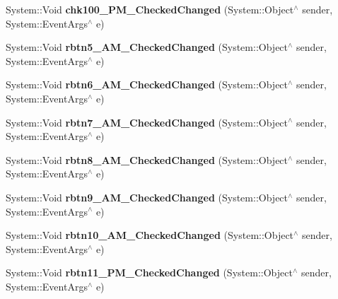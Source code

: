 \begin{DoxyCompactItemize}
\mbox{\label{class_project1_1_1_my_form_ac8af13c679c845dc2d29e9720146a7be}} 
System\+::\+Void {\bfseries chk100\+\_\+P\+M\+\_\+\+Checked\+Changed} (System\+::\+Object$^\wedge$ sender, System\+::\+Event\+Args$^\wedge$ e)
\item 
\mbox{\label{class_project1_1_1_my_form_a7147d1d188fee9fd56869d07780a08f8}} 
System\+::\+Void {\bfseries rbtn5\+\_\+A\+M\+\_\+\+Checked\+Changed} (System\+::\+Object$^\wedge$ sender, System\+::\+Event\+Args$^\wedge$ e)
\item 
\mbox{\label{class_project1_1_1_my_form_ad0f51e6d0ec40ceb0e3123a0d0440ff4}} 
System\+::\+Void {\bfseries rbtn6\+\_\+A\+M\+\_\+\+Checked\+Changed} (System\+::\+Object$^\wedge$ sender, System\+::\+Event\+Args$^\wedge$ e)
\item 
\mbox{\label{class_project1_1_1_my_form_abf2ce2ec145d6beaa222946c22a253a7}} 
System\+::\+Void {\bfseries rbtn7\+\_\+A\+M\+\_\+\+Checked\+Changed} (System\+::\+Object$^\wedge$ sender, System\+::\+Event\+Args$^\wedge$ e)
\item 
\mbox{\label{class_project1_1_1_my_form_ae656fdbb63f6fc17dda715639ac0c693}} 
System\+::\+Void {\bfseries rbtn8\+\_\+A\+M\+\_\+\+Checked\+Changed} (System\+::\+Object$^\wedge$ sender, System\+::\+Event\+Args$^\wedge$ e)
\item 
\mbox{\label{class_project1_1_1_my_form_a3d8d8f199a0fee97a236734181017c28}} 
System\+::\+Void {\bfseries rbtn9\+\_\+A\+M\+\_\+\+Checked\+Changed} (System\+::\+Object$^\wedge$ sender, System\+::\+Event\+Args$^\wedge$ e)
\item 
\mbox{\label{class_project1_1_1_my_form_afa8d406b3bbeeb42d4639605ddb49cf6}} 
System\+::\+Void {\bfseries rbtn10\+\_\+A\+M\+\_\+\+Checked\+Changed} (System\+::\+Object$^\wedge$ sender, System\+::\+Event\+Args$^\wedge$ e)
\item 
\mbox{\label{class_project1_1_1_my_form_a83f8a1df05ebfcea109542c5de31d2e2}} 
System\+::\+Void {\bfseries rbtn11\+\_\+P\+M\+\_\+\+Checked\+Changed} (System\+::\+Object$^\wedge$ sender, System\+::\+Event\+Args$^\wedge$ e)

\end{DoxyCompactItemize}

